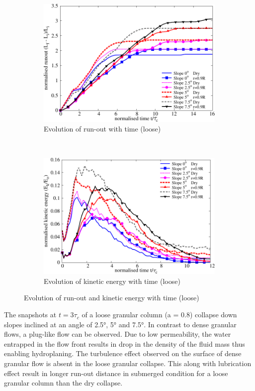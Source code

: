 \begin{figure}
\centering
\begin{subfigure}[b]{0.95\textwidth}
\centering
\includegraphics[width=0.97\columnwidth]{Runout_loose_slope}
\caption{Evolution of run-out with time (loose)}
\label{fig:run_loose}
\end{subfigure} \\
\begin{subfigure}[b]{0.95\textwidth}
\centering
\includegraphics[width=0.97\columnwidth]{KE_loose_slope}
\caption{Evolution of kinetic energy with time (loose)}
\label{fig:KE_loose}
\end{subfigure}
\caption{Evolution of run-out and kinetic energy with time (loose)}
\label{fig:KE_run_loose}
\end{figure}

The snapshots at $t = 3\tau_c$ of a loose granular column (a = 0.8) collapse 
down slopes inclined at an angle of 2.5\si{\degree}, 5\si{\degree} and 
7.5\si{\degree}. In contrast to dense granular flows, a plug-like flow can be 
observed. Due to low permeability, the water entrapped in the flow front 
results in drop in the density of the fluid mass thus enabling hydroplaning. 
The turbulence effect observed on the surface of dense granular flow is absent 
in the loose granular collapse. This along with lubrication effect result in 
longer run-out distance in submerged condition for a loose granular column than 
the dry collapse. 

